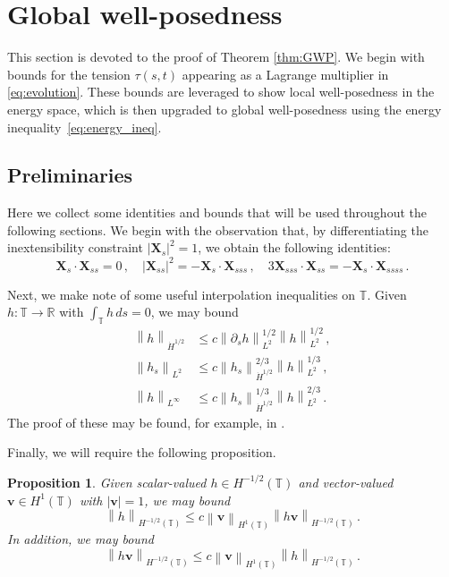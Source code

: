 \documentclass[11pt,reqno]{amsart}
\newcommand{\R}{\mathbb{R}}
\newcommand{\T}{\mathbb{T}}
\newcommand{\X}{\bm{X}}
\newcommand{\bv}{\bm{v}}
\newcommand{\p}{\partial}
\newcommand{\abs}[1]{\left\lvert #1 \right\rvert}
\newcommand{\norm}[1]{\left\lVert #1 \right\rVert}
\numberwithin{equation}{section}
\newtheorem{proposition}[theorem]{Proposition}
\theoremstyle{definition}
\begin{document}
\section{Global well-posedness}\label{sec:GWP}
This section is devoted to the proof of Theorem \ref{thm:GWP}. We begin with bounds for the tension $\tau(s,t)$ appearing as a Lagrange multiplier in \eqref{eq:evolution}. These bounds are leveraged to show local well-posedness in the energy space, which is then upgraded to global well-posedness using the energy inequality~\eqref{eq:energy_ineq}.


\subsection{Preliminaries}
Here we collect some identities and bounds that will be used throughout the following sections. We begin with the observation that, by differentiating the inextensibility constraint $\abs{\X_s}^2=1$, we obtain the following identities:
\begin{equation}\label{eq:inex_ids}
  \X_s\cdot\X_{ss}=0\,, \quad 
  \abs{\X_{ss}}^2 =-\X_s\cdot\X_{sss}\,, \quad
  3\X_{sss}\cdot\X_{ss} = -\X_s\cdot\X_{ssss}\,.
\end{equation}

Next, we make note of some useful interpolation inequalities on $\T$. Given $h:\T\to \R$ with $\int_\T h\,ds=0$, we may bound
\begin{equation}\label{eq:interps}
\begin{aligned}
  \norm{h}_{\dot H^{1/2}}&\le c\norm{\p_sh}_{L^2}^{1/2}\norm{h}_{L^2}^{1/2}\,,\\
%
  \norm{h_s}_{L^2}&\le c\norm{h_s}_{\dot H^{1/2}}^{2/3}\norm{h}_{L^2}^{1/3}\,,\\
  \norm{h}_{L^\infty} &\le c\norm{h_s}_{\dot H^{1/2}}^{1/3}\norm{h}_{L^2}^{2/3}\,.
\end{aligned}
\end{equation}
The proof of these may be found, for example, in \cite{brezis2018gagliardo}.



Finally, we will require the following proposition. 
%
\begin{proposition}\label{prop:H_minus_halfbd}
Given scalar-valued $h\in H^{-1/2}(\T)$ and vector-valued $\bv\in H^1(\T)$ with $\abs{\bv}=1$, we may bound
  \begin{equation}\label{eq:Hminushalf1}
  \norm{h}_{H^{-1/2}(\T)} \le c\norm{\bv}_{H^1(\T)}\norm{h \bv}_{H^{-1/2}(\T)}\,.
\end{equation}
In addition, we may bound
  \begin{equation}\label{eq:Hminushalf2}
  \norm{h\bm{v}}_{H^{-1/2}(\T)} \le c\norm{\bv}_{H^1(\T)}\norm{h}_{H^{-1/2}(\T)}\,.
\end{equation}
\end{proposition}
\end{document}
